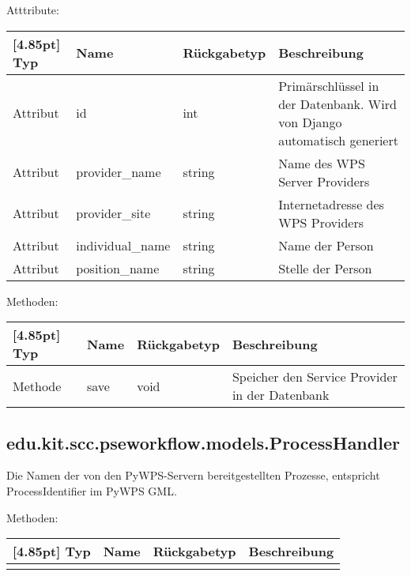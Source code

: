			Atttribute:
			\begin{center}
				\setlength\tabcolsep{5pt}
				\renewcommand{\arraystretch}{1.5}
				
				\begin{tabularx}{\textwidth}{|l|l|l|X|}
					\hline
					\rowcolor[gray]{0.75}[4.85pt]
					Typ & Name & Rückgabetyp & Beschreibung \\ \hline 
					Attribut & id & int & Primärschlüssel in der Datenbank. Wird von Django automatisch generiert \\ \hline
					Attribut & provider\_name & string & Name des WPS Server Providers\\ \hline
					Attribut & provider\_site & string & Internetadresse des WPS Providers \\ \hline
					Attribut & individual\_name & string & Name der Person\\ \hline
					Attribut & position\_name & string & Stelle der Person \\ \hline
				\end{tabularx}
			\end{center}
			
			Methoden:
			\begin{center}
				\setlength\tabcolsep{5pt}
				\renewcommand{\arraystretch}{1.5}
				
				\begin{tabularx}{\textwidth}{|l|l|l|X|}
					\hline
					\rowcolor[gray]{0.75}[4.85pt]
					Typ & Name & Rückgabetyp & Beschreibung \\ \hline 
					Methode & save & void & Speicher den Service Provider in der Datenbank \\
					\hline
				\end{tabularx}
			\end{center}
			
			


		\subsection{edu.kit.scc.pseworkflow.models.ProcessHandler}
			Die Namen der von den PyWPS-Servern bereitgestellten Prozesse, entspricht ProcessIdentifier im PyWPS GML.
			
			Methoden:
			\begin{center}
				\setlength\tabcolsep{5pt}
				\renewcommand{\arraystretch}{1.5}
				
				\begin{tabularx}{\textwidth}{|l|l|l|X|}
					\hline
					\rowcolor[gray]{0.75}[4.85pt]
					Typ & Name & Rückgabetyp & Beschreibung \\ \hline 
					&&& \\
					\hline
				\end{tabularx}
			\end{center}
			
